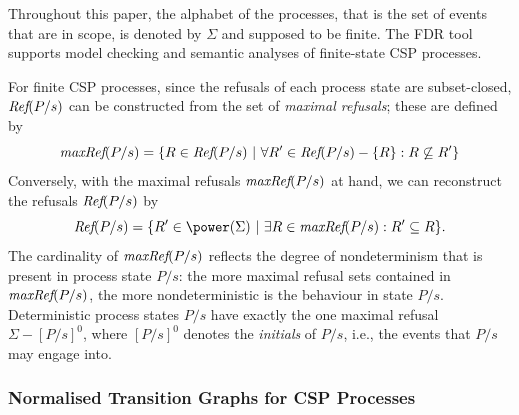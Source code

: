 Throughout this paper, the alphabet of the processes, that is the set of
events that are in scope, is denoted by $\Sigma$ and supposed to be finite. 
The
FDR tool~\cite{fdr} supports model checking and semantic analyses of
finite-state CSP processes.


For finite CSP processes, since the refusals of each process state are
subset-closed, $\text{\it Ref}(P/s)$ can be
constructed from the set of \emph{maximal refusals}; these are defined by 
%
\begin{equation}
\text{\it maxRef}(P/s) = \{ R \in\text{\it Ref}(P/s)~|~\forall R'\in \text{\it Ref}(P/s) - \{ R\}: R \not\subseteq R'\}
\end{equation}
%
Conversely, with the maximal refusals $\text{\it maxRef}(P/s)$ at hand, we can
reconstruct the refusals $\text{\it Ref}(P/s)$ by  
%
\begin{equation}
\refs(P/s) = \{ R'\in\power(\Sigma)~|~\exists R\in \maxrefs(P/s): R'\subseteq R \}.
\end{equation}
%
The cardinality of $\text{\it maxRef}(P/s)$ reflects the degree of
nondeterminism that is present in process state $P/s$: the more maximal refusal sets
contained in  $\text{\it maxRef}(P/s)$, the more nondeterministic is the behaviour in
state $P/s$. Deterministic process states $P/s$ have exactly the one maximal refusal
$\Sigma-[P/s]^0$, where $[P/s]^0$ denotes the \emph{initials} of $P/s$, i.e.,   the events that $P/s$ may engage into.


\subsubsection*{Normalised Transition Graphs for CSP Processes}
\label{sec:ntg}

